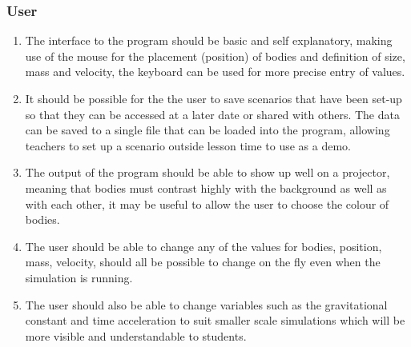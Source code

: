 \pagebreak

\subsubsection{User}
\begin{enumerate}
\item The interface to the program should be basic and self explanatory, making use of the mouse for the placement (position) of bodies and definition of size, mass and velocity, the keyboard can be used for more precise entry of values.
\item It should be possible for the the user to save scenarios that have been set-up so that they can be accessed at a later date or shared with others. The data can be saved to a single file that can be loaded into the program, allowing teachers to set up a scenario outside lesson time to use as a demo.
\item The output of the program should be able to show up well on a projector, meaning that bodies must contrast highly with the background as well as with each other, it may be useful to allow the user to choose the colour of bodies.
\item The user should be able to change any of the values for bodies, position, mass, velocity, should all be possible to change on the fly even when the simulation is running.
\item The user should also be able to change variables such as the gravitational constant and time acceleration to suit smaller scale simulations which will be more visible and understandable to students.
\end{enumerate}
